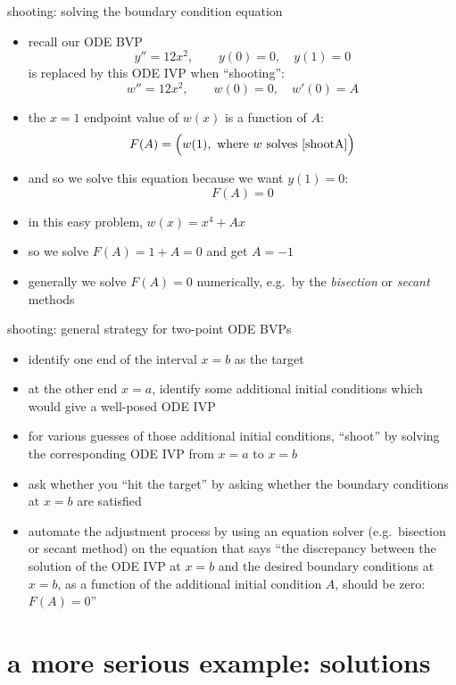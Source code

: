 \documentclass[10pt,hyperref]{beamer}
\begin{document}
\begin{frame}{shooting: solving the boundary condition equation} 

\begin{itemize}
\item recall our ODE BVP
    $$y'' = 12 x^2, \qquad y(0)=0, \quad y(1)=0$$
is replaced by this ODE IVP when ``shooting'':
\begin{equation}\label{shootA}
w'' = 12 x^2, \qquad w(0)=0, \quad w'(0)=A
\end{equation}
\item the $x=1$ endpoint value of $w(x)$ \alert{is a function of $A$}:
	$$F(A) = \Big(w(1), \text{ where } w \text{ solves \eqref{shootA}}\Big)$$
\item and so we solve this equation because we want $y(1)=0$:
	$$F(A) = 0$$
\item in this easy problem, $w(x)=x^4+Ax$
\item so we solve $F(A) = 1 + A = 0$ and get $A=-1$ 
\item generally we solve $F(A)=0$ numerically, e.g.~by the \emph{bisection} or \emph{secant} methods 
\end{itemize}
\end{frame}


\begin{frame}{shooting: general strategy for two-point ODE BVPs} 

\begin{itemize}
\item identify one end of the interval $x=b$ as the target
\item at the other end $x=a$, identify some additional initial conditions which would give a well-posed ODE IVP
\item for various guesses of those additional initial conditions, ``shoot'' by solving the corresponding ODE IVP from $x=a$ to $x=b$
\item ask whether you ``hit the target'' by asking whether the boundary conditions at $x=b$ are satisfied
\item automate the adjustment process by using an equation solver (e.g.~bisection or secant method) on the equation that says ``the discrepancy between the solution of the ODE IVP at $x=b$ and the desired boundary conditions at $x=b$, as a function of the additional initial condition $A$, should be zero: $F(A)=0$''
\end{itemize}
\end{frame}


\section[serious example: solved]{a more serious example: solutions}
\end{document}
